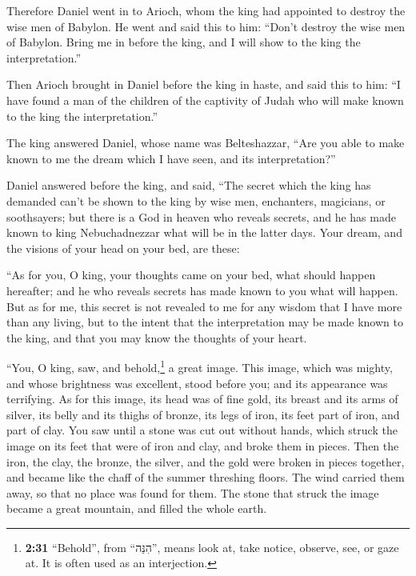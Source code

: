  Therefore Daniel went in to Arioch, whom the king had
appointed to destroy the wise men of Babylon. He went and said this to
him: ``Don't destroy the wise men of Babylon. Bring me in before the
king, and I will show to the king the interpretation.''

 Then Arioch brought in Daniel before the king in haste,
and said this to him: ``I have found a man of the children of the
captivity of Judah who will make known to the king the interpretation.''

 The king answered Daniel, whose name was Belteshazzar,
``Are you able to make known to me the dream which I have seen, and its
interpretation?''

 Daniel answered before the king, and said, ``The secret
which the king has demanded can't be shown to the king by wise men,
enchanters, magicians, or soothsayers;  but there is a
God in heaven who reveals secrets, and he has made known to king
Nebuchadnezzar what will be in the latter days. Your dream, and the
visions of your head on your bed, are these:

 ``As for you, O king, your thoughts came on your bed,
what should happen hereafter; and he who reveals secrets has made known
to you what will happen.  But as for me, this secret is
not revealed to me for any wisdom that I have more than any living, but
to the intent that the interpretation may be made known to the king, and
that you may know the thoughts of your heart.

 ``You, O king, saw, and behold,\footnote{\textbf{2:31}
  ``Behold'', from ``הִנֵּה'', means look at, take notice, observe, see,
  or gaze at. It is often used as an interjection.} a great image. This
image, which was mighty, and whose brightness was excellent, stood
before you; and its appearance was terrifying.  As for
this image, its head was of fine gold, its breast and its arms of
silver, its belly and its thighs of bronze,  its legs of
iron, its feet part of iron, and part of clay.  You saw
until a stone was cut out without hands, which struck the image on its
feet that were of iron and clay, and broke them in pieces.
 Then the iron, the clay, the bronze, the silver, and the
gold were broken in pieces together, and became like the chaff of the
summer threshing floors. The wind carried them away, so that no place
was found for them. The stone that struck the image became a great
mountain, and filled the whole earth.

